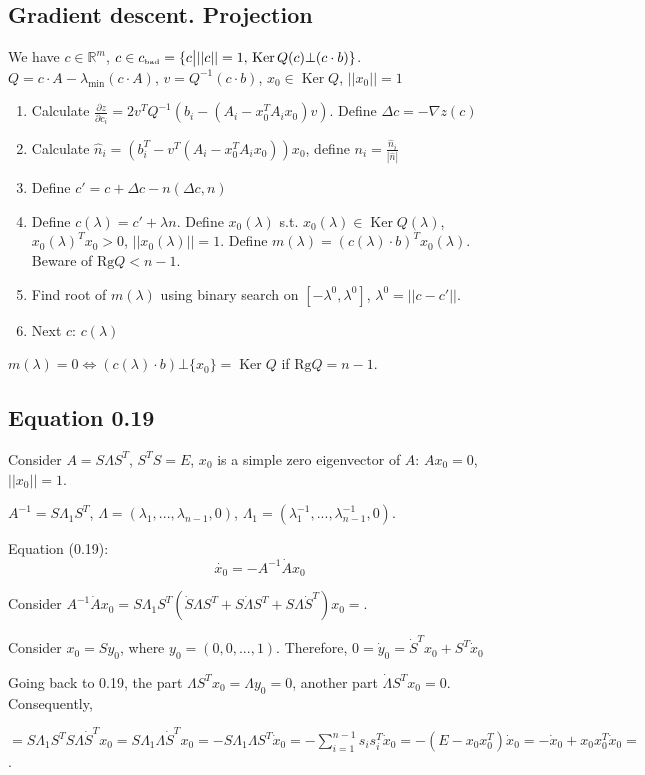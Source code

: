 \documentclass[a4paper]{article}
\DeclareMathOperator{\Ker}{Ker}
\begin{document}
\subsection{Gradient descent. Projection}
We have $c\in\mathbb{R}^m$, $c\in c_{\mbox{\tiny bad}}=\{c\big| ||c||=1,\,\Ker Q(c)\bot (c\cdot b)\}$. $Q=c\cdot A-\lambda_{\min}(c\cdot A)$, $v=Q^{-1}(c\cdot b)$, $x_0\in\Ker Q$, $||x_0||=1$
\begin{enumerate}
\item Calculate $\frac{\partial z}{\partial c_i}=2v^TQ^{-1}(b_i-(A_i-x_0^TA_ix_0)v)$. Define $\Delta c=-\nabla z(c)$
\item Calculate $\hat{n}_i=\left(b_i^T-v^T(A_i-x_0^TA_ix_0)\right)x_0$, define $n_i=\frac{\hat{n}_i}{|\hat{n}|}$
\item Define $c'=c+\Delta c-n(\Delta c, n)$
\item Define $c(\lambda)=c'+\lambda n$. Define $x_0(\lambda)$ s.t. $x_0(\lambda)\in \Ker Q(\lambda)$, $x_0(\lambda)^Tx_0>0$, $||x_0(\lambda)||=1$. Define $m(\lambda)=(c(\lambda)\cdot b)^Tx_0(\lambda)$. Beware of $\mbox{Rg}Q<n-1$.
\item Find root of $m(\lambda)$ using binary search on $[-\lambda^0,\lambda^0]$, $\lambda^0=||c-c'||$.
\item Next $c$: $c(\lambda)$
\end{enumerate}

$m(\lambda)=0\Leftrightarrow (c(\lambda)\cdot b)\bot\{x_0\}=\Ker Q$ if $\mbox{Rg}Q=n-1$.
\subsection{Equation 0.19}
Consider $A=S\Lambda S^T$, $S^TS=E$, $x_0$ is a simple zero eigenvector of $A$: $Ax_0=0$, $||x_0||=1$.

$A^{-1}=S\Lambda_1S^T$, $\Lambda=(\lambda_1,...,\lambda_{n-1},0)$, $\Lambda_1=(\lambda_1^{-1},...,\lambda_{n-1}^{-1},0)$.

Equation (0.19):
$$\dot{x_0}=-A^{-1}\dot{A}x_0$$

Consider $A^{-1}\dot{A}x_0=S\Lambda_1S^T(\dot{S}\Lambda S^T+S\dot{\Lambda} S^T+S\Lambda \dot{S}^T)x_0\boxed{=}$.

Consider $x_0=Sy_0$, where $y_0=(0,0,...,1)$. Therefore, $0=\dot{y}_0=\dot{S}^Tx_0+S^T\dot{x}_0$

Going back to 0.19, the part $\Lambda S^Tx_0=\Lambda y_0=0$, another part $\dot{\Lambda}S^Tx_0=0$. Consequently,

$\boxed{=}S\Lambda_1S^TS\Lambda \dot{S}^Tx_0=S\Lambda_1\Lambda\dot{S}^Tx_0=-S\Lambda_1\Lambda S^T\dot{x}_0=-\sum\limits_{i=1}^{n-1}s_is_i^T\dot{x}_0=-(E-x_0x_0^T)\dot{x}_0=-\dot{x}_0+x_0x_0^T\dot{x}_0\boxed{=}$.
\end{document}

